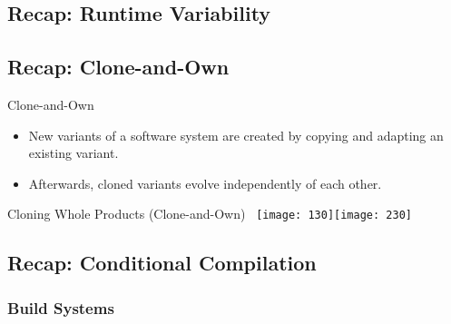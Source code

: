 
\subsection{Recap: Runtime Variability}

\subsection{Recap: Clone-and-Own}
\begin{frame}{\myframetitle}
	\begin{mycolumns}[animation=none]
		\begin{definition}{Clone-and-Own}
			\begin{itemize}
				\item New variants of a software system are created by copying and adapting an existing variant.
				\item Afterwards, cloned variants evolve independently of each other.
			\end{itemize}	
		\end{definition}	
		\vspace{3mm}		
		\begin{example}{Cloning Whole Products (Clone-and-Own)}
			~\hfill\texttt{[image: 130]}\hfill\texttt{[image: 230]}\hfill~
		\end{example}
	\mynextcolumn
	\end{mycolumns}
\end{frame}

\subsection{Recap: Conditional Compilation}

\subsubsection*{Build Systems}

